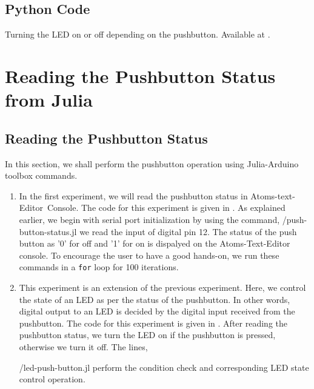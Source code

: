\subsection{Python Code}
\lstset{style=mystyle}
\label{sec:push-python-code}

\begin{pycode}
\label{py:push-100}

\end{pycode}

\begin{pycode}
  {Turning the LED on or off depending on the pushbutton.  Available at
  .}
\label{py:push-200}

\end{pycode}


\section{Reading the Pushbutton Status from Julia}
\subsection{Reading the Pushbutton Status} 
In this section, we shall perform the pushbutton operation using
Julia-Arduino toolbox commands.
\begin{enumerate}
\item In the first experiment, we will read the pushbutton status in
  Atoms-text-Editor\ Console. The code for this experiment is given in
  . As explained earlier, we begin with serial
  port initialization by using the command,
  {\LocPushjuliacode/push-button-status.jl} we read the input of
  digital pin 12. The status of the push button as '0' for off and
  '1' for on is dispalyed on the Atoms-Text-Editor console. To
  encourage the user to have a good hands-on, we run these commands in
  a {\tt for} loop for 100 iterations.

\item This experiment is an extension of the previous
  experiment. Here, we control the state of an LED as per the status
  of the pushbutton. In other words, digital output to an LED is
  decided by the digital input received from the pushbutton. The code
  for this experiment is given in . After reading
  the pushbutton status, we turn the LED on if the pushbutton is
  pressed, otherwise we turn it off. The lines,
  
  {\LocPushjuliacode/led-push-button.jl} perform the condition check
  and corresponding LED state control operation.
\end{enumerate}

